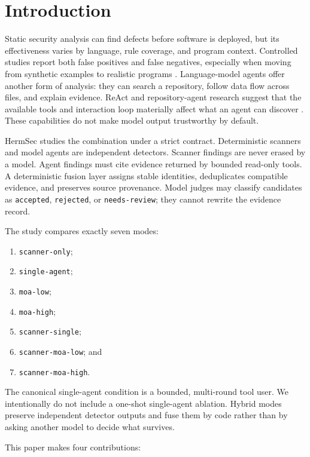 \documentclass[sigconf,nonacm]{acmart}
\newcommand{\mode}[1]{\nolinkurl{#1}}
\newcommand{\findingstate}[1]{\texttt{#1}}
\begin{document}
\section{Introduction}
Static security analysis can find defects before software is deployed, but its effectiveness varies by language, rule coverage, and program context. Controlled studies report both false positives and false negatives, especially when moving from synthetic examples to realistic programs \cite{goseva2015capability}. Language-model agents offer another form of analysis: they can search a repository, follow data flow across files, and explain evidence. ReAct and repository-agent research suggest that the available tools and interaction loop materially affect what an agent can discover \cite{yao2023react,yang2024sweagent}. These capabilities do not make model output trustworthy by default.

HermSec studies the combination under a strict contract. Deterministic scanners and model agents are independent detectors. Scanner findings are never erased by a model. Agent findings must cite evidence returned by bounded read-only tools. A deterministic fusion layer assigns stable identities, deduplicates compatible evidence, and preserves source provenance. Model judges may classify candidates as \findingstate{accepted}, \findingstate{rejected}, or \findingstate{needs-review}; they cannot rewrite the evidence record.

The study compares exactly seven modes:

\begin{enumerate}[leftmargin=*]
  \item \mode{scanner-only};
  \item \mode{single-agent};
  \item \mode{moa-low};
  \item \mode{moa-high};
  \item \mode{scanner-single};
  \item \mode{scanner-moa-low}; and
  \item \mode{scanner-moa-high}.
\end{enumerate}

The canonical single-agent condition is a bounded, multi-round tool user. We intentionally do not include a one-shot single-agent ablation. Hybrid modes preserve independent detector outputs and fuse them by code rather than by asking another model to decide what survives.

This paper makes four contributions:
\end{document}
